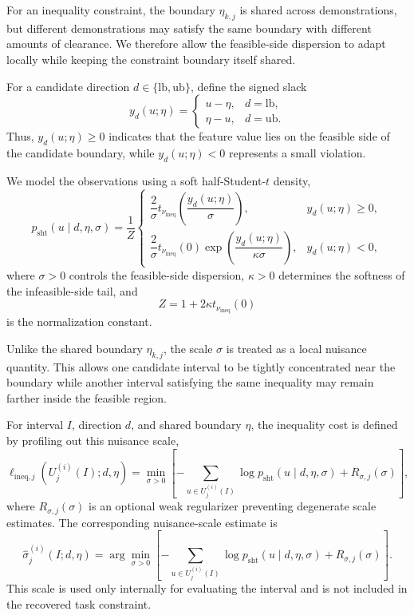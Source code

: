 \documentclass[lettersize,journal]{IEEEtran}
\begin{document}
For an inequality constraint, the boundary $\eta_{k,j}$ is shared across demonstrations, but different demonstrations may satisfy the same boundary with different amounts of clearance. We therefore allow the feasible-side dispersion to adapt locally while keeping the constraint boundary itself shared.

For a candidate direction $d\in\{\mathrm{lb},\mathrm{ub}\}$, define the signed slack
\[
y_d(u;\eta)
=
\begin{cases}
u-\eta,
& d=\mathrm{lb},\\
\eta-u,
& d=\mathrm{ub}.
\end{cases}
\]
Thus, $y_d(u;\eta)\geq0$ indicates that the feature value lies on the feasible side of the candidate boundary, while $y_d(u;\eta)<0$ represents a small violation.

We model the observations using a soft half-Student-$t$ density,
\[
p_{\mathrm{sht}}
(u\mid d,\eta,\sigma)
=
\frac{1}{Z}
\begin{cases}
\dfrac{2}{\sigma}
t_{\nu_{\mathrm{ineq}}}
\left(
\dfrac{y_d(u;\eta)}{\sigma}
\right),
&
y_d(u;\eta)\geq0,
\\[2mm]
\dfrac{2}{\sigma}
t_{\nu_{\mathrm{ineq}}}(0)
\exp
\left(
\dfrac{y_d(u;\eta)}
{\kappa\sigma}
\right),
&
y_d(u;\eta)<0,
\end{cases}
\]
where $\sigma>0$ controls the feasible-side dispersion, $\kappa>0$ determines the softness of the infeasible-side tail, and
\[
Z
=
1+2\kappa t_{\nu_{\mathrm{ineq}}}(0)
\]
is the normalization constant.

Unlike the shared boundary $\eta_{k,j}$, the scale $\sigma$ is treated as a local nuisance quantity. This allows one candidate interval to be tightly concentrated near the boundary while another interval satisfying the same inequality may remain farther inside the feasible region.

For interval $I$, direction $d$, and shared boundary $\eta$, the inequality cost is defined by profiling out this nuisance scale,
\[
\ell_{\mathrm{ineq},j}
\left(
U_j^{(i)}(I);
d,\eta
\right)
=
\min_{\sigma>0}
\left[
-\sum_{u\in U_j^{(i)}(I)}
\log
p_{\mathrm{sht}}
(u\mid d,\eta,\sigma)
+
R_{\sigma,j}(\sigma)
\right],
\]
where $R_{\sigma,j}(\sigma)$ is an optional weak regularizer preventing degenerate scale estimates. The corresponding nuisance-scale estimate is
\[
\widehat{\sigma}_{j}^{(i)}
(I;d,\eta)
=
\arg\min_{\sigma>0}
\left[
-\sum_{u\in U_j^{(i)}(I)}
\log
p_{\mathrm{sht}}
(u\mid d,\eta,\sigma)
+
R_{\sigma,j}(\sigma)
\right].
\]
This scale is used only internally for evaluating the interval and is not included in the recovered task constraint.
\end{document}
